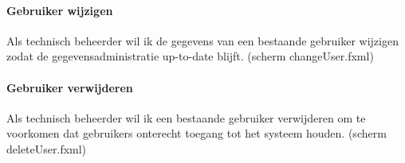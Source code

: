 \documentclass[11pt, a4paper]{article}
\begin{document}
\paragraph{Gebruiker wijzigen} Als technisch beheerder wil ik de gegevens van een bestaande gebruiker wijzigen zodat de gegevensadministratie up-to-date blijft. (scherm changeUser.fxml)

\paragraph{Gebruiker verwijderen} Als technisch beheerder wil ik een bestaande gebruiker verwijderen om te voorkomen dat gebruikers onterecht toegang tot het systeem houden. (scherm deleteUser.fxml)
\end{document}
